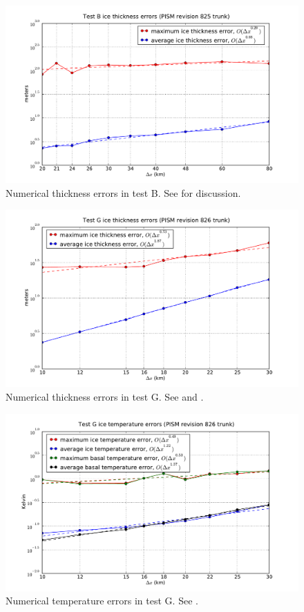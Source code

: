 \documentclass[11pt,final]{amsart}
\begin{document}
\begin{figure}[ht]
\includegraphics[width=4.8in,keepaspectratio=true]{figs/test-B-thickness}
\caption{Numerical thickness errors in test B. See \cite{BLKCB} for discussion.}
\label{fig:thickerrsB}
\end{figure}

\begin{figure}[ht]
\includegraphics[width=5.0in,keepaspectratio=true]{figs/test-G-thickness}
\caption{Numerical thickness errors in test G.  See \cite{BBL} and \cite{BLKCB}.}
\label{fig:thickerrsG}
\end{figure}

\begin{figure}[ht]
\includegraphics[width=5.0in,keepaspectratio=true]{figs/test-G-temp}
\caption{Numerical temperature errors in test G. See \cite{BBL}.}
\label{fig:temperrsG}
\end{figure}
\end{document}
